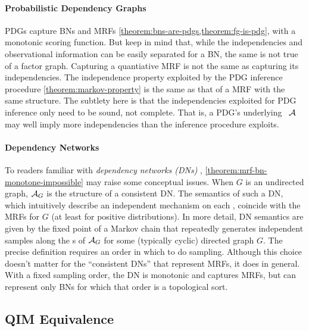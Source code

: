 \paragraph{Probabilistic Dependency Graphs}
PDGs capture BNs and MRFs
\cref{theorem:bns-are-pdgs,theorem:fg-is-pdg},
with a monotonic scoring function.
But keep in mind that, while the independencies and observational information can be easily separated for a BN, the same is not true of a factor graph.
Capturing a quantiative MRF is not the same as capturing its independencies.
The independence property exploited by the PDG inference procedure \cref{theorem:markov-property} is the same as that of a MRF with the same structure. 
The subtlety here is that the independencies exploited for PDG inference only need to be sound, not complete. 
That is, a PDG's underlying \hgraph\ $\mathcal A$ may well imply more independencies than the inference procedure exploits. 
    

\paragraph{Dependency Networks}
To readers familiar with \emph{dependency networks (DNs)} \citep{heckerman2000dependency},
\cref{theorem:mrf-bn-monotone-impossible} may raise some conceptual issues. 
When $G$ is an undirected graph, $\mathcal A_G$ is the structure of a consistent DN.
The semantics of such a DN,
which intuitively describe an independent mechanism on each \arc,
coincide with the MRFs for $G$ (at least for positive distributions). 
In more detail, DN semantics are given by the fixed point of a Markov chain that repeatedly generates independent samples along the \arc s of $\mathcal A_G$ for some (typically cyclic) directed graph $G$. The precise definition requires an order in which to do sampling. Although this choice doesn't matter for the ``consistent DNs'' that represent MRFs, it does in general. With a fixed sampling order, the DN is monotonic and captures MRFs, but can represent only BNs for which that order is a topological sort.



\subsection{QIM Equivalence}
    \label{sec:QIM-equivalence}


